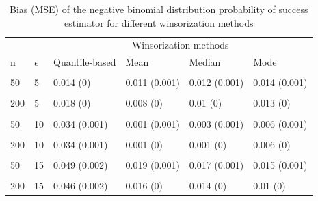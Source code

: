 \documentclass[
]{article}
\begin{document}
\begin{CodeChunk}
\begin{table}[H]

\caption{\label{tab:unnamed-chunk-6}Bias (MSE) of the negative binomial distribution probability of success estimator for different winsorization methods}
\centering
\begin{tabular}[t]{l|l|l|l|l|l}
\hline
\multicolumn{2}{c|}{ } & \multicolumn{4}{c}{Winsorization methods} \\
\cline{3-6}
n & $\epsilon$ & Quantile-based & Mean & Median & Mode\\
\hline
\cellcolor{gray!6}{20} & \cellcolor{gray!6}{5} & \cellcolor{gray!6}{0.013 (0.001)} & \cellcolor{gray!6}{0.017 (0.002)} & \cellcolor{gray!6}{0.018 (0.002)} & \cellcolor{gray!6}{0.019 (0.002)}\\
\hline
50 & 5 & 0.014 (0) & 0.011 (0.001) & 0.012 (0.001) & 0.014 (0.001)\\
\hline
\cellcolor{gray!6}{100} & \cellcolor{gray!6}{5} & \cellcolor{gray!6}{0.017 (0)} & \cellcolor{gray!6}{0.01 (0)} & \cellcolor{gray!6}{0.011 (0)} & \cellcolor{gray!6}{0.014 (0.001)}\\
\hline
200 & 5 & 0.018 (0) & 0.008 (0) & 0.01 (0) & 0.013 (0)\\
\hline
\cellcolor{gray!6}{20} & \cellcolor{gray!6}{10} & \cellcolor{gray!6}{0.031 (0.001)} & \cellcolor{gray!6}{0.005 (0.002)} & \cellcolor{gray!6}{0.007 (0.002)} & \cellcolor{gray!6}{0.009 (0.002)}\\
\hline
50 & 10 & 0.034 (0.001) & 0.001 (0.001) & 0.003 (0.001) & 0.006 (0.001)\\
\hline
\cellcolor{gray!6}{100} & \cellcolor{gray!6}{10} & \cellcolor{gray!6}{0.034 (0.001)} & \cellcolor{gray!6}{0.002 (0)} & \cellcolor{gray!6}{0 (0)} & \cellcolor{gray!6}{0.004 (0)}\\
\hline
200 & 10 & 0.034 (0.001) & 0.001 (0) & 0.001 (0) & 0.006 (0)\\
\hline
\cellcolor{gray!6}{20} & \cellcolor{gray!6}{15} & \cellcolor{gray!6}{0.045 (0.002)} & \cellcolor{gray!6}{0.006 (0.002)} & \cellcolor{gray!6}{0.004 (0.002)} & \cellcolor{gray!6}{0.001 (0.002)}\\
\hline
50 & 15 & 0.049 (0.002) & 0.019 (0.001) & 0.017 (0.001) & 0.015 (0.001)\\
\hline
\cellcolor{gray!6}{100} & \cellcolor{gray!6}{15} & \cellcolor{gray!6}{0.047 (0.002)} & \cellcolor{gray!6}{0.015 (0.001)} & \cellcolor{gray!6}{0.013 (0.001)} & \cellcolor{gray!6}{0.009 (0.001)}\\
\hline
200 & 15 & 0.046 (0.002) & 0.016 (0) & 0.014 (0) & 0.01 (0)\\
\hline
\end{tabular}
\end{table}

\end{CodeChunk}
\end{document}
